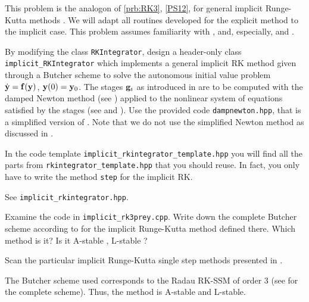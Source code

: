 \begin{problem} \label{prb:implicit_RK}
  This problem is the analogon of \ref{prb:RK3}, \ref{PS12}, for general implicit
  Runge-Kutta methods . We will adapt all routines developed for the
  explicit method to the implicit case. This problem assumes familiarity with
  , and, especially,  and .

  \begin{subproblem}[5] \label{subprb:RK3_1} By modifying the class
    \verb|RKIntegrator|, design a header-only \Cpp{} class
    \verb|implicit_RKIntegrator| which implements a general implicit RK method
    given through a Butcher scheme  to solve the autonomous initial value problem
    $\dot{{\mathbf{y}}} = {\mathbf{f}}({\mathbf{y}})$, ${\mathbf{y}}(0) = {\mathbf{y}}_{0}$. The stages ${\mathbf{g}}_i$ as introduced
    in  are to be computed with the damped Newton method (see
    ) applied to the nonlinear system of equations
    satisfied by the stages (see  and
    ). Use the provided code \texttt{dampnewton.hpp}, that
    is a simplified version of . Note that we do not
    use the simplified Newton method as discussed in .

    In the code template \verb|implicit_rkintegrator_template.hpp| you will find all
    the parts from \verb|rkintegrator_template.hpp| that you should reuse. In
    fact, you only have to write the method \texttt{step} for the implicit RK.
    
    \cprotEnv 
    \begin{solution} See \verb|implicit_rkintegrator.hpp|.
    \end{solution}
  \end{subproblem}
  
  \begin{subproblem}[2]
    Examine the code in  \texttt{implicit\_rk3prey.cpp}. Write down the complete
    Butcher scheme according to  for the implicit Runge-Kutta method
    defined there. Which method is it? Is it A-stable , L-stable
    ? 

    \begin{hint}
      Scan the particular implicit Runge-Kutta single step methods presented in 
      .
    \end{hint}
  \end{subproblem}
  \begin{solution}
  The Butcher scheme used corresponds to the Radau RK-SSM of order 3 
      (see  for the complete scheme). Thus, the method is A-stable and L-stable.
  \end{solution}


\end{problem}
